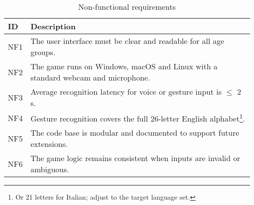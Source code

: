 \begin{table}[h]
\centering
\caption{Non-functional requirements}
\begin{tabularx}{\linewidth}{@{}lX@{}}
\toprule
\textbf{ID} & \textbf{Description} \\ \midrule
NF1 & The user interface must be clear and readable for all age groups. \\
NF2 & The game runs on Windows, macOS and Linux with a standard webcam and microphone. \\
NF3 & Average recognition latency for voice or gesture input is \(\leq\) 2 s. \\
NF4 & Gesture recognition covers the full 26-letter English alphabet\footnote{Or 21 letters for Italian; adjust to the target language set.}. \\
NF5 & The code base is modular and documented to support future extensions. \\
NF6 & The game logic remains consistent when inputs are invalid or ambiguous. \\ \bottomrule
\end{tabularx}
\end{table}
